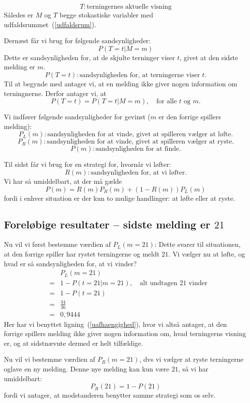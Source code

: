 \documentclass[12pt,oneside,a4paper]{article}
\newcommand{\bas}{\begin{eqnarray*}}
\newcommand{\eas}{\end{eqnarray*}}
\newcommand{\be}{\begin{equation}}
\newcommand{\ee}{\end{equation}}
\begin{document}
$$
T : \mbox{terningernes aktuelle visning}
$$
Således er $M$ og $T$ begge stokastiske variabler med
udfaldsrummet~(\ref{udfaldsrum}).

Dernæst får vi brug for følgende sandsynligheder:
$$
P(T=t| M=m)
$$
Dette er sandsynligheden for, at de skjulte terninger viser $t$,
givet at den sidste melding er $m$.
$$
P(T=t) : \mbox{sandsynligheden for, at terningerne viser $t$.}
$$
Til at begynde med antager vi, at en melding ikke giver nogen information om
terningnerne. Derfor antager vi, at
\be
P(T=t) = P(T=t | M=m), \quad \mbox{for alle $t$ og $m$.}
\label{uafhaengighed}
\ee

Vi indfører følgende sandsynligheder for gevinst ($m$ er den forrige spillers melding):
$$
P_L(m) : \mbox{sandsynligheden for at vinde, givet at spilleren vælger at
løfte.}
$$
$$
P_R(m) : \mbox{sandsynligheden for at vinde, givet at spilleren vælger at
ryste.}
$$
$$
P(m) : \mbox{sandsynligheden for at finde.}
$$

Til sidst får vi brug for en strategi for, hvornår vi løfter:
$$
R(m) : \mbox{sandsynligheden for, at vi løfter.}
$$
Vi har så umiddelbart, at der må gælde
\be
P(m) = R(m) P_R(m) + (1-R(m)) P_L(m)
\label{samlet}
\ee
fordi i enhver situation er der kun to mulige handlinger: at løfte eller at ryste.

\subsection{Foreløbige resultater -- sidste melding er $21$}
Nu vil vi først bestemme værdien af $P_L(m=21)$: Dette svarer til situationen,
at den forrige spiller har rystet terningerne og meldt $21$. Vi vælger nu at
løfte, og hvad er så sandsynligheden for, at vi vinder?
\bas
 && P_L(m=21) \\
&=& 1 - P(t=21|m=21) , \quad \mbox{alt undtagen 21 vinder}\\
&=& 1 - P(t=21) \\
&=& \frac{34}{36} \\
&=& 0,9444
\eas
Her har vi benyttet ligning~(\ref{uafhaengighed}), hvor vi altså antager,
at den forrige spillers melding ikke giver nogen information om, hvad
terningerns visning er, og at sidstnævnte dermed er helt tilfældige.

Nu vil vi bestemme værdien af $P_R(m=21)$, dvs vi vælger at ryste terningerne oglave en ny melding. Denne nye melding kan kun være $21$, så vi har umiddelbart:
$$
P_R(21) = 1 - P(21)
$$
fordi vi antager, at modstanderen benytter samme strategi som os selv.
\end{document}
